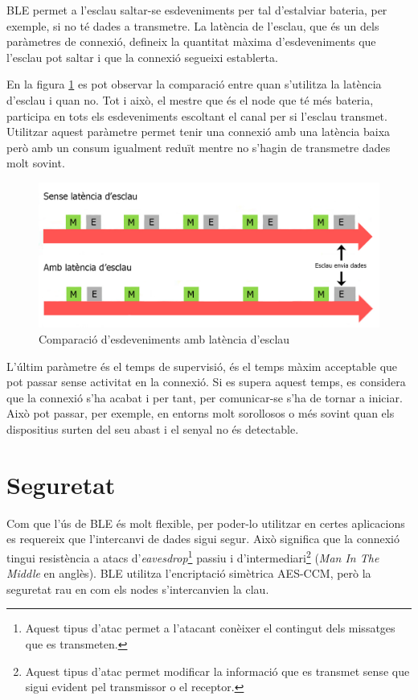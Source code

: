 BLE permet a l'esclau saltar-se esdeveniments per tal d'estalviar bateria, per exemple, si no té dades a transmetre.
La latència de l'esclau, que és un dels paràmetres de connexió, defineix la quantitat màxima d'esdeveniments que l'esclau pot saltar i que la connexió segueixi establerta.

En la figura \ref{fig:slave_latency} es pot observar la comparació entre quan s'utilitza la latència d'esclau i quan no.
Tot i això, el mestre que és el node que té més bateria, participa en tots els esdeveniments escoltant el canal per si l'esclau transmet.
Utilitzar aquest paràmetre permet tenir una connexió amb una latència baixa però amb un consum igualment reduït mentre no s'hagin de transmetre dades molt sovint.

\begin{figure}[!h]
	\begin{center}
		\includegraphics{./images/slave_latency_new.jpeg}
		\caption{Comparació d'esdeveniments amb latència d'esclau \cite{slave_latency}}
		\label{fig:slave_latency}
	\end{center}
\end{figure}

L'últim paràmetre és el temps de supervisió, és el temps màxim acceptable que pot passar sense activitat en la connexió.
Si es supera aquest temps, es considera que la connexió s'ha acabat i per tant, per comunicar-se s'ha de tornar a iniciar.
Això pot passar, per exemple, en entorns molt sorollosos o més sovint quan els dispositius surten del seu abast i el senyal no és detectable.

\section{Seguretat}
\label{sec:security}
Com que l'ús de BLE és molt flexible, per poder-lo utilitzar en certes aplicacions es requereix que l'intercanvi de dades sigui segur.
Això significa que la connexió tingui resistència a atacs d'\textit{eavesdrop}\footnote{Aquest tipus d'atac permet a l'atacant conèixer el contingut dels missatges que es transmeten.} passiu i d'intermediari\footnote{Aquest tipus d'atac permet modificar la informació que es transmet sense que sigui evident pel transmissor o el receptor.} (\textit{Man In The Middle} en anglès).
BLE utilitza l'encriptació simètrica AES-CCM, però la seguretat rau en com els nodes s'intercanvien la clau.

